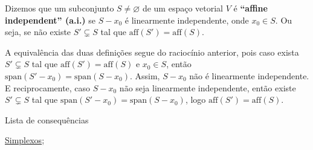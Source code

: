 \begin{defi}
    Dizemos que um subconjunto $S \neq \varnothing$ de um espaço vetorial $V$ é \textbf{``affine independent'' (a.i.)} se $S - x_0$ é linearmente independente, onde $x_0 \in S$. Ou seja, se não existe $S' \subsetneq S$ tal que $\text{aff}(S') = \text{aff}(S)$.
\end{defi}

A equivalência das duas definições segue do raciocínio anterior, pois caso exista $S' \subsetneq S$ tal que $\text{aff}(S') = \text{aff}(S)$ e $x_0 \in S$, então $\text{span}(S'-x_0) = \text{span}(S-x_0)$. Assim, $S - x_0$ não é linearmente independente. E reciprocamente, caso $S - x_0$ não seja linearmente independente, então existe $S' \subsetneq S$ tal que $\text{span}(S' - x_0) = \text{span}(S - x_0)$, logo $\text{aff}(S') = \text{aff}(S)$.

\begin{titlemize}{Lista de consequências}
	\item \hyperref[simplexo-def]{Simplexos};\\ %
\end{titlemize}